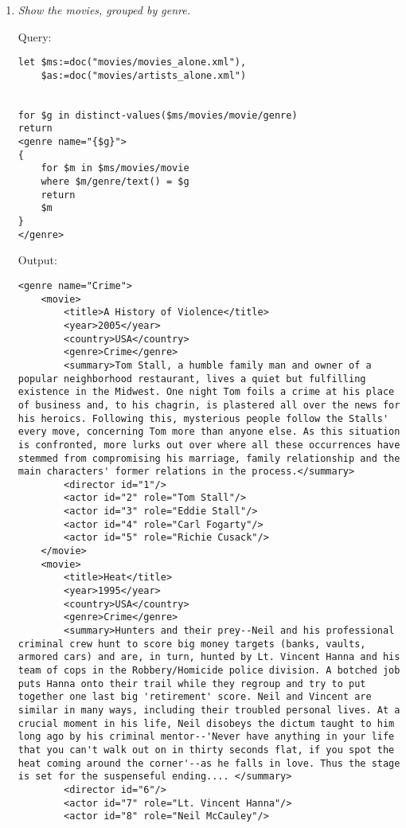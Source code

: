 \documentclass[a4paper, notitlepage]{article}
\begin{document}
\begin{enumerate}
\item  
  \emph{Show the movies, grouped by genre.} 
  
Query: 
  
\begin{lstlisting}
let $ms:=doc("movies/movies_alone.xml"),
    $as:=doc("movies/artists_alone.xml")
    
    
for $g in distinct-values($ms/movies/movie/genre)
return 
<genre name="{$g}">  
{
    for $m in $ms/movies/movie
    where $m/genre/text() = $g
    return 
    $m
}
</genre>
\end{lstlisting}
  
Output:
  
\begin{lstlisting}
<genre name="Crime">
	<movie>
		<title>A History of Violence</title>
		<year>2005</year>
		<country>USA</country>
		<genre>Crime</genre>
		<summary>Tom Stall, a humble family man and owner of a popular neighborhood restaurant, lives a quiet but fulfilling existence in the Midwest. One night Tom foils a crime at his place of business and, to his chagrin, is plastered all over the news for his heroics. Following this, mysterious people follow the Stalls' every move, concerning Tom more than anyone else. As this situation is confronted, more lurks out over where all these occurrences have stemmed from compromising his marriage, family relationship and the main characters' former relations in the process.</summary>
		<director id="1"/>
		<actor id="2" role="Tom Stall"/>
		<actor id="3" role="Eddie Stall"/>
		<actor id="4" role="Carl Fogarty"/>
		<actor id="5" role="Richie Cusack"/>
	</movie>
	<movie>
		<title>Heat</title>
		<year>1995</year>
		<country>USA</country>
		<genre>Crime</genre>
		<summary>Hunters and their prey--Neil and his professional criminal crew hunt to score big money targets (banks, vaults, armored cars) and are, in turn, hunted by Lt. Vincent Hanna and his team of cops in the Robbery/Homicide police division. A botched job puts Hanna onto their trail while they regroup and try to put together one last big 'retirement' score. Neil and Vincent are similar in many ways, including their troubled personal lives. At a crucial moment in his life, Neil disobeys the dictum taught to him long ago by his criminal mentor--'Never have anything in your life that you can't walk out on in thirty seconds flat, if you spot the heat coming around the corner'--as he falls in love. Thus the stage is set for the suspenseful ending.... </summary>
		<director id="6"/>
		<actor id="7" role="Lt. Vincent Hanna"/>
		<actor id="8" role="Neil McCauley"/>

\end{lstlisting}
\end{enumerate}
\end{document}
